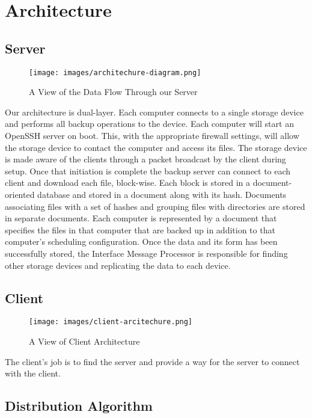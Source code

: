 \chapter{Architecture}
\section{Server}

\begin{figure}[hb]
\centering
\texttt{[image: images/architechure-diagram.png]}
\caption{A View of the Data Flow Through our Server}
\end{figure}

Our architecture is dual-layer. Each computer connects to a single storage
device and performs all backup operations to the device. Each computer will start
an OpenSSH server on boot. This, with the appropriate firewall settings, will
allow the storage device to contact the computer and access its files. The
storage device is made aware of the clients through a packet broadcast by the
client during setup. Once that initiation is complete the backup server can
connect to each client and download each file, block-wise. Each block is stored
in a document-oriented database and stored in a document along with its hash.
Documents associating files with a set of hashes and grouping files with
directories are stored in separate documents. Each computer is represented by a
document that specifies the files in that computer that are backed up in
addition to that computer's scheduling configuration. Once the data and its form
has been successfully stored, the Interface Message Processor is responsible for
finding other storage devices and replicating the data to each device.

\section{Client}
\begin{figure}[hb]
\centering
\texttt{[image: images/client-arcitechure.png]}
\caption{A View of Client Architecture}
\end{figure}

The client's job is to find the server and provide a way for the server to connect with the client.

\section{Distribution Algorithm}

